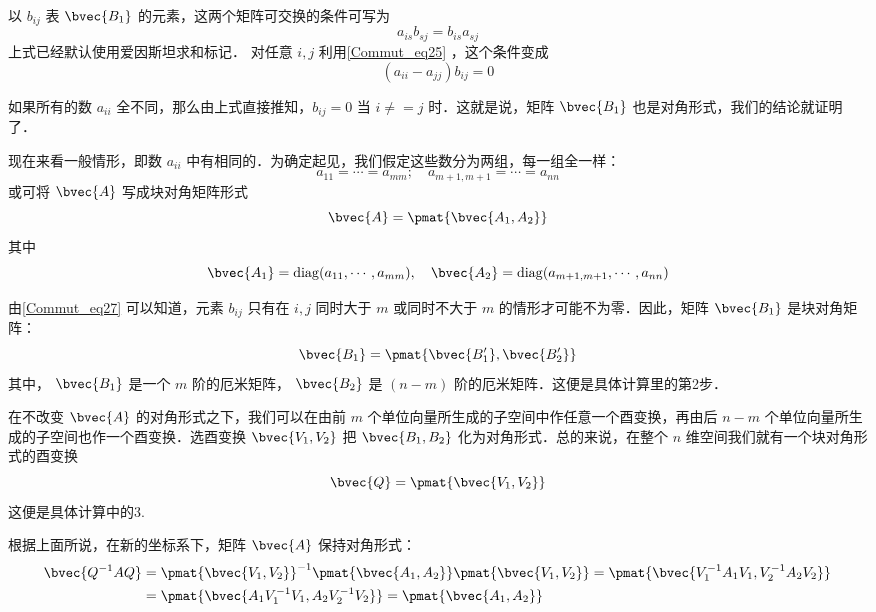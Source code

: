 以 $b_{ij}$ 表 $\bvec{B_1}$ 的元素，这两个矩阵可交换的条件可写为
\begin{equation}
a_{is}b_{sj}=b_{is}a_{sj}
\end{equation}
上式已经默认使用爱因斯坦求和标记．
对任意 $i,j$ 利用\autoref{Commut_eq25} ，这个条件变成
\begin{equation}
(a_{ii}-a_{jj})b_{ij}=0
\label{Commut_eq27}
\end{equation}

如果所有的数 $a_{ii}$ 全不同，那么由上式直接推知，$b_{ij}=0$ 当 $i\neq=j$ 时．这就是说，矩阵 $\bvec{B_1}$ 也是对角形式，我们的结论就证明了．

现在来看一般情形，即数 $a_{ii}$ 中有相同的．为确定起见，我们假定这些数分为两组，每一组全一样：
\begin{equation}
a_{11}=\cdots=a_{mm};\quad a_{m+1,m+1}=\cdots=a_{nn}
\end{equation}
或可将 $\bvec{A}$ 写成块对角矩阵形式
\begin{equation}
\bvec{A}=\pmat{\bvec{A_1,A_2}}
\end{equation}
其中
\begin{equation}
\bvec{A_1}=\mathrm{diag}(a_{11},\cdots,a_{mm}),\quad
\bvec{A_2}=\mathrm{diag}(a_{m+1,m+1},\cdots,a_{nn})
\end{equation}

由\autoref{Commut_eq27} 可以知道，元素 $b_{ij}$ 只有在 $i,j$ 同时大于 $m$ 或同时不大于 $m$ 的情形才可能不为零．因此，矩阵 $\bvec{B_1}$ 是块对角矩阵：
\begin{equation}
\bvec{B_1}=\pmat{\bvec{B'_1},\bvec{B'_2}}
\end{equation}
其中， $\bvec{B_1}$ 是一个 $m$ 阶的厄米矩阵， $\bvec{B_2}$ 是 $(n-m)$ 阶的厄米矩阵．这便是具体计算里的第2步．

在不改变 $\bvec{A}$ 的对角形式之下，我们可以在由前 $m$ 个单位向量所生成的子空间中作任意一个酉变换，再由后 $n-m$ 个单位向量所生成的子空间也作一个酉变换．选酉变换 $\bvec{V_1,V_2}$ 把 $\bvec{B_1,B_2}$ 化为对角形式．总的来说，在整个 $n$ 维空间我们就有一个块对角形式的酉变换
\begin{equation}
\bvec{Q}=\pmat{\bvec{V_1,V_2}}
\end{equation}
这便是具体计算中的3.

根据上面所说，在新的坐标系下，矩阵 $\bvec{A}$ 保持对角形式：
\begin{equation}
\begin{aligned}
\bvec{Q^{-1}AQ}&=\pmat{\bvec{V_1,V_2}}^{-1}\pmat{\bvec{A_1,A_2}}\pmat{\bvec{V_1,V_2}}=\pmat{\bvec{V_1^{-1}A_1V_1,V_2^{-1}A_2V_2}}\\
&=\pmat{\bvec{A_1V_1^{-1}V_1,A_2V_2^{-1}V_2}}=\pmat{\bvec{A_1,A_2}}
\end{aligned}
\end{equation}

